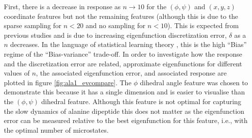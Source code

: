 First, there is a decrease in response as $n \rightarrow 10$ for the $(\phi, \psi)$ and $(x,y,z)$ coordinate features but not the remaining features (although this is due to the sparse sampling for $n<20$ and no sampling for $n<10$). This is expected from previous studies \cite{wuVariationalApproachLearning2019}\cite{mcgibbonVariationalCrossvalidationSlow2015} and is due to increasing eigenfunction discretization error, $\delta$  \cite{prinzMarkovModelsMolecular2011} as a $n$ decreases. In the language of statistical learning theory \cite{friedman2001elements}, this is the high ``Bias'' regime of the ``Bias-variance'' trade-off.  In order to investigate how the response and the discretization error  are related,  approximate eigenfunctions for different values of $n$, the associated eigenfunction error, and associated response are plotted in figure \ref{fig:ala1_evcompare}. The $\phi$ dihedral angle feature was chosen to demonstrate this because it has a single dimension and is easier to visualise than the $(\phi, \psi)$ dihedral feature. Although this feature is not optimal for capturing the slow dynamics of alanine dipeptide this does not matter as the eigenfunction error can be measured relative to the best eigenfunction for this feature, i.e., with the optimal number of microstates. 

